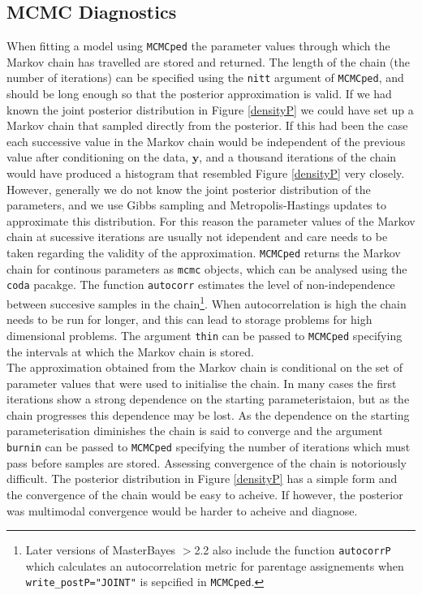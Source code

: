 \documentclass{article}
\begin{document}
\subsection{MCMC Diagnostics}
\label{MCMC.D-sec}

When fitting a model using \texttt{MCMCped} the parameter values through which the Markov chain has travelled are stored and returned.  The length of the chain (the number of iterations) can be specified using the \texttt{nitt} argument of \texttt{MCMCped}, and should be long enough so that the posterior approximation is valid.  If we had known the joint posterior distribution in Figure \ref{densityP} we could have set up a Markov chain that sampled directly from the posterior.  If this had been the case each successive value in the Markov chain would be independent of the previous value after conditioning on the data, ${\bm y}$, and a thousand iterations of the chain would have produced a histogram that resembled Figure \ref{densityP} very closely.  However, generally we do not know the joint posterior distribution of the parameters, and we use Gibbs sampling and Metropolis-Hastings updates to approximate this distribution. For this reason the parameter values of the Markov chain at sucessive iterations are usually not idependent and care needs to be taken regarding the validity of the approximation.  \texttt{MCMCped} returns the Markov chain for continous parameters as \texttt{mcmc} objects, which can be analysed using the \texttt{coda} pacakge.  The function \texttt{autocorr} estimates the level of non-independence between succesive samples in the chain\footnote{Later versions of MasterBayes $>$2.2 also include the function \texttt{autocorrP} which calculates an autocorrelation metric for parentage assignements when \texttt{write\_postP="JOINT"} is sepcified in \texttt{MCMCped}.}.  When autocorrelation is high the chain needs to be run for longer, and this can lead to storage problems for high dimensional problems. The argument \texttt{thin} can be passed to \texttt{MCMCped} specifying the intervals at which the Markov chain is stored.\\

The approximation obtained from the Markov chain is conditional on the set of parameter values that were used to initialise the chain.  In many cases the first iterations show a strong dependence on the starting parameteristaion, but as the chain progresses this dependence may be lost.  As the dependence on the starting parameterisation diminishes the chain is said to converge and the argument \texttt{burnin} can be passed to \texttt{MCMCped} specifying the number of iterations which must pass before samples are stored.  Assessing convergence of the chain is notoriously difficult.  The posterior distribution in Figure \ref{densityP} has a simple form and the convergence of the chain would be easy to acheive.  If however, the posterior was multimodal convergence would be harder to acheive and diagnose.\\  
 
\end{document}
